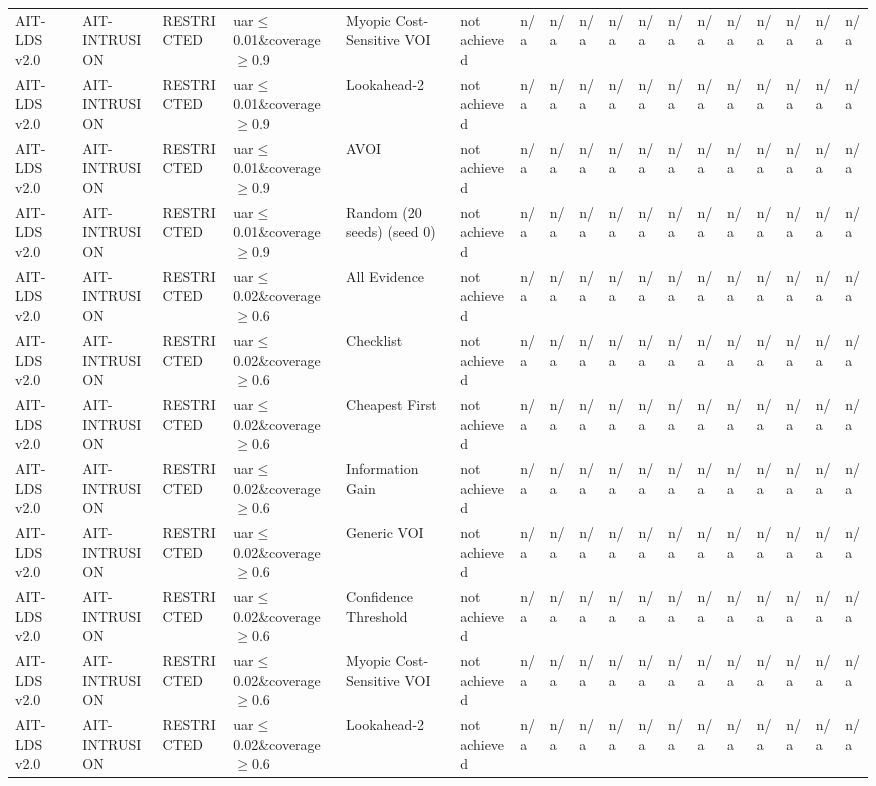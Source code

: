 \begin{table}[!ht]
{\begin{tabular}{llllllllllllllllll}
AIT-LDS v2.0 & AIT-INTRUSION & RESTRICTED & uar$\le$0.01\&coverage$\ge$0.9 & Myopic Cost-Sensitive VOI & not achieved & n/a & n/a & n/a & n/a & n/a & n/a & n/a & n/a & n/a & n/a & n/a & n/a \\
AIT-LDS v2.0 & AIT-INTRUSION & RESTRICTED & uar$\le$0.01\&coverage$\ge$0.9 & Lookahead-2 & not achieved & n/a & n/a & n/a & n/a & n/a & n/a & n/a & n/a & n/a & n/a & n/a & n/a \\
AIT-LDS v2.0 & AIT-INTRUSION & RESTRICTED & uar$\le$0.01\&coverage$\ge$0.9 & AVOI & not achieved & n/a & n/a & n/a & n/a & n/a & n/a & n/a & n/a & n/a & n/a & n/a & n/a \\
AIT-LDS v2.0 & AIT-INTRUSION & RESTRICTED & uar$\le$0.01\&coverage$\ge$0.9 & Random (20 seeds) (seed 0) & not achieved & n/a & n/a & n/a & n/a & n/a & n/a & n/a & n/a & n/a & n/a & n/a & n/a \\
AIT-LDS v2.0 & AIT-INTRUSION & RESTRICTED & uar$\le$0.02\&coverage$\ge$0.6 & All Evidence & not achieved & n/a & n/a & n/a & n/a & n/a & n/a & n/a & n/a & n/a & n/a & n/a & n/a \\
AIT-LDS v2.0 & AIT-INTRUSION & RESTRICTED & uar$\le$0.02\&coverage$\ge$0.6 & Checklist & not achieved & n/a & n/a & n/a & n/a & n/a & n/a & n/a & n/a & n/a & n/a & n/a & n/a \\
AIT-LDS v2.0 & AIT-INTRUSION & RESTRICTED & uar$\le$0.02\&coverage$\ge$0.6 & Cheapest First & not achieved & n/a & n/a & n/a & n/a & n/a & n/a & n/a & n/a & n/a & n/a & n/a & n/a \\
AIT-LDS v2.0 & AIT-INTRUSION & RESTRICTED & uar$\le$0.02\&coverage$\ge$0.6 & Information Gain & not achieved & n/a & n/a & n/a & n/a & n/a & n/a & n/a & n/a & n/a & n/a & n/a & n/a \\
AIT-LDS v2.0 & AIT-INTRUSION & RESTRICTED & uar$\le$0.02\&coverage$\ge$0.6 & Generic VOI & not achieved & n/a & n/a & n/a & n/a & n/a & n/a & n/a & n/a & n/a & n/a & n/a & n/a \\
AIT-LDS v2.0 & AIT-INTRUSION & RESTRICTED & uar$\le$0.02\&coverage$\ge$0.6 & Confidence Threshold & not achieved & n/a & n/a & n/a & n/a & n/a & n/a & n/a & n/a & n/a & n/a & n/a & n/a \\
AIT-LDS v2.0 & AIT-INTRUSION & RESTRICTED & uar$\le$0.02\&coverage$\ge$0.6 & Myopic Cost-Sensitive VOI & not achieved & n/a & n/a & n/a & n/a & n/a & n/a & n/a & n/a & n/a & n/a & n/a & n/a \\
AIT-LDS v2.0 & AIT-INTRUSION & RESTRICTED & uar$\le$0.02\&coverage$\ge$0.6 & Lookahead-2 & not achieved & n/a & n/a & n/a & n/a & n/a & n/a & n/a & n/a & n/a & n/a & n/a & n/a \\

\end{tabular}}
\end{table}
